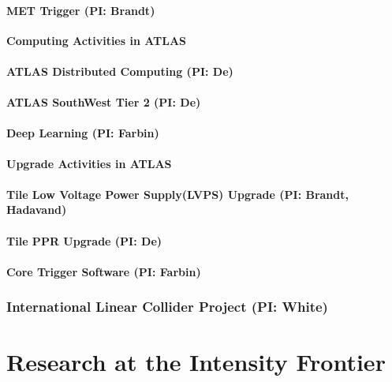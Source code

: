 \documentclass[11pt]{article}
\def\overhead#1{\part{#1}}
\def\onehead#1{\section{#1}}
\def\twohead#1{\subsection{#1}}
\def\centerhead#1{
	\begin{center}
	\Large\textbf{#1}
	\end{center}}
\begin{document}
\twohead{MET Trigger (PI: Brandt)}


\centerhead{Computing Activities in ATLAS}


\twohead{ATLAS Distributed Computing (PI: De)}


\twohead{ATLAS SouthWest Tier 2 (PI: De)}


\twohead{Deep Learning (PI: Farbin)}


\centerhead{Upgrade Activities in ATLAS}

\twohead{Tile Low Voltage Power Supply(LVPS) Upgrade  (PI: Brandt, Hadavand)}
\label{sec:Tile-HL-LHC}


\twohead{Tile PPR Upgrade (PI: De)}


\twohead{Core Trigger Software (PI: Farbin)}


\onehead{International Linear Collider Project (PI: White)}









\newpage


\overhead{Research at the Intensity Frontier}


\end{document}
